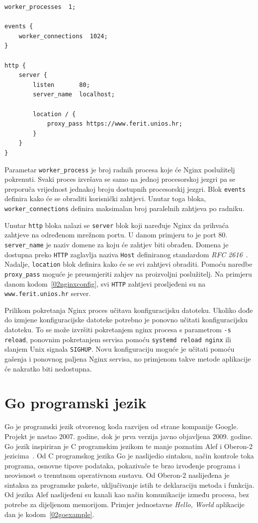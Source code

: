 \begin{lstlisting}[float=h]
worker_processes  1;

events {
    worker_connections  1024;
}

http {
    server {
        listen       80;
        server_name  localhost;

        location / {
            proxy_pass https://www.ferit.unios.hr;
        }
    }
}
\end{lstlisting}

Parametar \texttt{worker\_process} je broj radnih procesa koje će Nginx poslužitelj pokrenuti.
Svaki proces izvršava se samo na jednoj procesorskoj jezgri pa se preporuča vrijednost jednakoj
broju dostupnih procesorskij jezgri. Blok \texttt{events} definira kako će se obraditi korisnički
zahtjevi.  Unutar toga bloka, \texttt{worker\_connections} definira maksimalan broj paralelnih
zahtjeva po radniku.

Unutar \texttt{http} bloka nalazi se \texttt{server} blok koji naređuje Nginx da prihvaća zahtjeve
na određenom mrežnom portu. U danom primjeru to je port 80. \texttt{server\_name} je naziv domene
za koju će zahtjev biti obrađen. Domena je dostupna preko \texttt{HTTP} zaglavlja naziva
\texttt{Host} definiranog standardom \textit{RFC 2616}~\citep{fielding1999hypertext}. Nadalje,
\texttt{location} blok definira kako će se svi zahtjevi obraditi. Pomoću naredbe
\texttt{proxy\_pass} moguće je preusmjeriti zahjev na proizvoljni poslužitelj. Na primjeru danom
kodom~\ref{02nginxconfig}, svi \texttt{HTTP} zahtjevi prosljeđeni su na \texttt{www.ferit.unios.hr}
server.

Prilikom pokretanja Nginx proces učitava konfiguracijsku datoteku. Ukoliko dođe do izmjene
konfiguracijske datoteke potrebno je ponovno učitati konfiguracijsku datoteku. To se može izvršiti
pokretanjem nginx procesa s parametrom \texttt{-s reload}, ponovnim pokretanjem servisa pomoću
\texttt{systemd reload nginx} ili slanjem Unix signala \texttt{SIGHUP}. Novu konfiguraciju moguće je
učitati pomoću gašenja i ponovnog paljena Nginx servisa, no primjenom takve metode aplikacije će
nakratko biti nedostupna.

\section{Go programski jezik}
Go je programski jezik otvorenog koda razvijen od strane kompanije Google. Projekt je nastao 2007.
godine, dok je prva verzija javno objavljena 2009. godine. Go jezik inspiriran je C programskim
jezikom te manje poznatim Alef i Oberon-2 jezicima~\citep{donovan2015go}.  Od C programskog jezika
Go je naslijedio sintaksu, način kontrole toka programa, osnovne tipove podataka, pokazivače te brzo
izvođenje programa i neovisnost o trenutnom operativnom sustavu.  Od Oberon-2 naslijeđena je
sintaksa za programske pakete, uključivanje istih te deklaraciju metoda i funkcija. Od jezika Alef
naslijeđeni su kanali kao način komunikacije između procesa, bez potrebe za dijeljenom memorijom.
Primjer jednostavne \textit{Hello, World} aplikacije dan je kodom~\ref{02goexample}.

